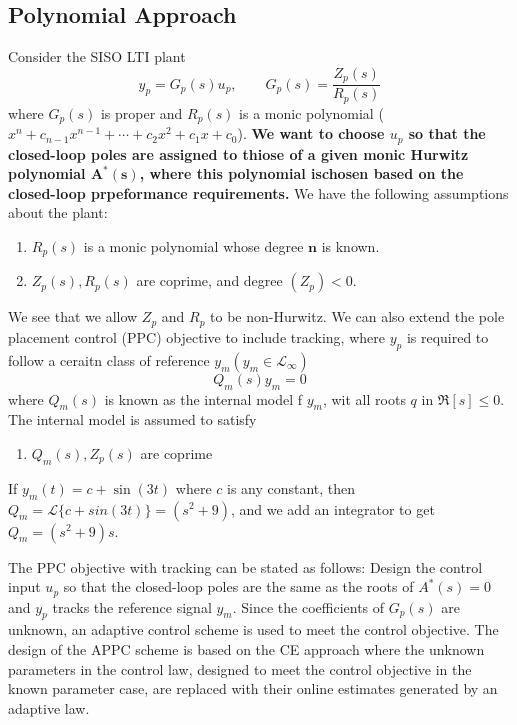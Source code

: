 \documentclass[10pt]{article}
\begin{document}
\begin{multicols*}{2}
\subsection{Polynomial Approach}
Consider the SISO LTI plant
\begin{equation}
	y_p = G_p (s) u_p, \qquad G_p(s) = \frac{Z_p(s)}{R_p(s)}
	\label{eqn: Gp}
\end{equation}
where $G_p(s)$ is proper and $R_p(s)$ is a monic polynomial ($x^n+c_{n-1} x^{n-1}+\cdots+c_2 x^2+c_1 x+c_0$). \textbf{We want to choose $u_p$ so that the closed-loop poles are assigned to thiose of a given monic Hurwitz polynomial $\mathbf{A^{*}(s)}$, where this polynomial ischosen based on the closed-loop prpeformance requirements.} We have the following assumptions about the plant:\
\begin{enumerate}
	\item $R_p(s)$ is a monic polynomial whose degree $\mathbf{n}$ is known.
	\item $Z_p(s), R_p(s)$ are coprime, and degree $(Z_p) < 0$.
\end{enumerate}
We see that we allow $Z_p$ and $R_p$ to be non-Hurwitz. We can also extend the pole placement control (PPC) objective to include tracking, where $y_p$ is required to follow a ceraitn class of reference $y_m (y_m \in \mathcal{L}_\infty )$
\begin{equation}
	Q_m(s) y_m = 0
\end{equation}
where $Q_m(s)$ is known as the internal model f $y_m$, wit all roots $q$ in $\Re[s] \leq 0$. The internal model is assumed to satisfy
\begin{enumerate}
	\item $Q_m(s), Z_p(s)$ are coprime
\end{enumerate}
\begin{frm-ex}
If $y_m (t) = c + \sin (3 t)$ where $c$ is any constant, then $Q_m = \mathcal{L}\{c + sin(3t)\} = (s^{2}+9)$, and we add an integrator to get $Q_m = (s^{2}+9)s$.
\end{frm-ex}

The PPC objective with tracking can be stated as follows: Design the control input $u_p$ so that the closed-loop poles are the same as the roots of $A^*(s)=0$ and $y_p$ tracks the reference signal $y_m$. Since the coefficients of $G_p(s)$ are unknown, an adaptive control scheme is used to meet the control objective. The design of the APPC scheme is based on the CE approach where the unknown parameters in the control law, designed to meet the control objective in the known parameter case, are replaced with their online estimates generated by an adaptive law.

\end{multicols*}
\end{document}
